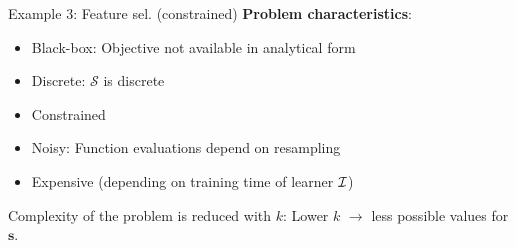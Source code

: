 \documentclass[11pt,compress,t,notes=noshow, xcolor=table]{beamer}
\begin{document}
\begin{vbframe}{Example 3: Feature sel. (constrained)}
\textbf{Problem characteristics}:
\begin{itemize}
	\item Black-box: Objective not available in analytical form
	\item Discrete: $\mathcal{S}$ is discrete
	\item Constrained 
	\item Noisy: Function evaluations depend on resampling	
	\item Expensive (depending on training time of learner $\mathcal{I}$)
\end{itemize}

\lz 

Complexity of the problem is reduced with $k$: Lower $k$ $\to$ less possible values for $\bm{s}$. 

\end{vbframe}
\end{document}
